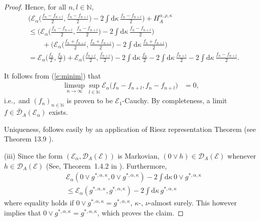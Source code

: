 \documentclass[11pt]{amsart}
\numberwithin{equation}{section}
\begin{document}
{\begin{proof}
Hence, for all $n,l\in\mathbb{N}$,
{\begin{equation}
\begin{aligned}
    &\big (
    \mathcal E_\alpha\big(\tfrac{f_n-f_{n+l}}{2},\tfrac{f_n-f_{n+l}}{2}\big)-{2}\int\mathrm{d}\kappa\,\tfrac{f_n-f_{n+l}}{2}\big )+
    H^{\alpha,{\rho},\kappa}_{A}
  \\
 &\le
    \big (
    \mathcal E_\alpha\big(\tfrac{f_n-f_{n+l}}{2},\tfrac{f_n-f_{n+l}}{2}\big)-{2}\int\mathrm{d}\kappa\,\tfrac{f_n-f_{n+l}}{2}\big)
  \\
 &\qquad+
    \big(
    \mathcal E_\alpha\big(\tfrac{f_n+f_{n+l}}{2},\tfrac{f_n+f_{n+l}}{2}\big)-{2}\int\mathrm{d}\kappa\,\tfrac{f_n+f_{n+l}}{2}\big)
  \\
 &=
   \mathcal E_\alpha\big(\tfrac{f_n}{2},\tfrac{f_n}{2}\big)+\mathcal E_\alpha\big(\tfrac{f_{n+l}}{2},\tfrac{f_{n+l}}{2}\big)-{2}\int\mathrm{d}\kappa\,\tfrac{f_n}{2}-{2}\int\mathrm{d}\kappa\,\tfrac{f_{n+l}}{2}
   -{2}\int\mathrm{d}\kappa\,\tfrac{f_n-f_{n+l}}{2}.
 \end{aligned}
\end{equation}}

It follows from (\ref{e:minim}) that
\begin{equation}\label{e:dir.4al}
\begin{aligned}
    \limsup_{n\to\infty}\sup_{l\in\mathbb{N}}\mathcal E_\alpha\big(f_n-f_{n+l},f_n-f_{n+l}\big)
 &=0,
 \end{aligned}
\end{equation}
i.e.,\ and $(f_n)_{n\in{{\mathbb N}}}$ is proven to be ${\mathcal E}_1$-Cauchy. By completeness, a limit $f\in\bar{\mathcal D}_A({\mathcal E}_\alpha)$ exists.{\smallskip}

Uniqueness, follows easily by an application of Riesz representation Theorem (see Theorem 13.9 \cite{AliBor1999}).{\smallskip}

(iii) Since the form $({\mathcal E}_\alpha,{\mathcal D}_A({\mathcal E}))$ is Markovian,
$(0\vee h)\in {\mathcal D}_A({\mathcal E})$ whenever
$h\in{\mathcal D}_A({\mathcal E})$
(See, Theorem~1.4.2 in \cite{FukushimaOshimaTakeda1994}).
Furthermore,
\begin{equation}
\label{e:gwedge0}
\begin{aligned}
   &{\mathcal E}_\alpha(0{\vee} g^{\ast,\alpha,\kappa},0{\vee} g^{\ast,\alpha,\kappa})-{2}\int\mathrm{d}\kappa\,0{\vee} g^{\ast,\alpha,\kappa}
  \\
 &\le
   {{\mathcal E}_\alpha(g^{\ast,\alpha,\kappa},g^{\ast,\alpha,\kappa})-{2}\int\mathrm{d}\kappa\,g^{\ast,\alpha,\kappa}}
\end{aligned}
\end{equation}
where equality holds if $0{\vee} g^{\ast,\alpha,\kappa}=g^{\ast,\alpha,\kappa}$, $\kappa$-, $\nu$-almost surely.
This however implies that $0{\vee} g^{\ast,\alpha,\kappa}=g^{\ast,\alpha,\kappa}$, which proves the claim.
\end{proof}{\smallskip}

}
\end{document}
